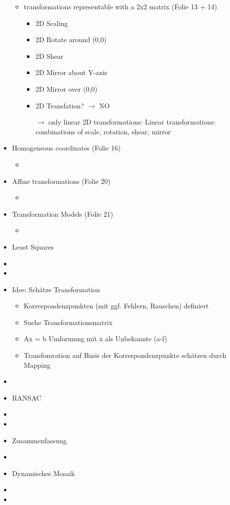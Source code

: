 \documentclass{report}
\begin{document}
\begin{itemize}
\begin{itemize}
			\item transformations representable with a 2x2 matrix (Folie 13 + 14)
			\begin{itemize}
				\item 2D Scaling
				\item 2D Rotate around (0,0)
				\item 2D Shear
				\item 2D Mirror about Y-axis
				\item 2D Mirror over (0,0)
				\item 2D Translation? $\rightarrow$ NO
				\item[$\rightarrow$] only linear 2D transformations:
				\newline Linear transformations: combinations of scale, rotation, shear, mirror
			\end{itemize}
		\end{itemize}
		
		\item Homogeneous coordinates (Folie 16)
		\begin{itemize}
			\item 
		\end{itemize}
		
		\item Affine transformations (Folie 20)
		\begin{itemize}
			\item 
		\end{itemize}
		
		\item Transformation Models (Folie 21)
		\begin{itemize}
			\item 
		\end{itemize}
		
		\item Least Squares
		\item 
		\item 
		\item Idee: Schätze Transformation
		\begin{itemize}
			\item Korrespondenzpunkten (mit ggf. Fehlern, Rauschen) definiert
			\item Suche Transformationsmatrix
			\item Ax = b Umformung mit x als Unbekannte (a-f)
			\item Transfomration auf Basis der Korrespondenzpunkte schätzen durch Mapping
		\end{itemize}
		\item 
		\item RANSAC
		\item 
		\item 
		\item Zusammenfassung
		\item 
		\item Dynamisches Mosaik
		\item 
		\item 
	\end{itemize}
	\newpage
	
\end{document}
